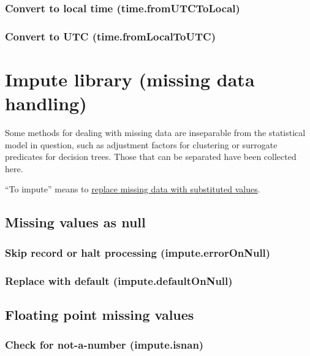 \documentclass{article}
\theoremstyle{definition}
\begin{document}
\subsubsection{Convert to local time (time.fromUTCToLocal)}

\subsubsection{Convert to UTC (time.fromLocalToUTC)}

\pagebreak

\hypertarget{hsec:impute}{}
\section{Impute library (missing data handling)}
\label{sec:impute}

Some methods for dealing with missing data are inseparable from the statistical model in question, such as adjustment factors for clustering or surrogate predicates for decision trees.  Those that can be separated have been collected here.

``To impute'' means to \href{http://en.wikipedia.org/wiki/Imputation_(statistics)}{replace missing data with substituted values}.

\subsection{Missing values as null}

\subsubsection{Skip record or halt processing (impute.errorOnNull)}

\subsubsection{Replace with default (impute.defaultOnNull)}

\subsection{Floating point missing values}

\subsubsection{Check for not-a-number (impute.isnan)}
\end{document}
